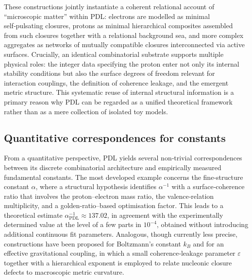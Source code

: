 \documentclass[11pt,a4paper]{article}
\begin{document}
These constructions jointly instantiate a coherent relational account of “microscopic matter” within PDL: electrons are modelled as minimal self‑pulsating closures, protons as minimal hierarchical composites assembled from such closures together with a relational background sea, and more complex aggregates as networks of mutually compatible closures interconnected via active surfaces.\cite{Laubscher2026FullPDL} Crucially, an identical combinatorial substrate supports multiple physical roles: the integer data specifying the proton enter not only its internal stability conditions but also the surface degrees of freedom relevant for interaction couplings, the definition of coherence leakage, and the emergent metric structure.\cite{Laubscher2026Alpha,Laubscher2026TopologicalReformulation} This systematic reuse of internal structural information is a primary reason why PDL can be regarded as a unified theoretical framework rather than as a mere collection of isolated toy models.

\subsection{Quantitative correspondences for constants}
From a quantitative perspective, PDL yields several non‑trivial correspondences between its discrete combinatorial architecture and empirically measured fundamental constants. The most developed example concerns the fine‑structure constant $\alpha$, where a structural hypothesis identifies $\alpha^{-1}$ with a surface‑coherence ratio that involves the proton–electron mass ratio, the valence‑relation multiplicity, and a golden‑ratio–based optimisation factor. This leads to a theoretical estimate $\alpha^{-1}_{\mathrm{PDL}} \approx 137.02$, in agreement with the experimentally determined value at the level of a few parts in $10^{-4}$, obtained without introducing additional continuous fit parameters.\cite{Laubscher2026Alpha,Laubscher2026GoldenRatioSurface} Analogous, though currently less precise, constructions have been proposed for Boltzmann’s constant $k_B$ and for an effective gravitational coupling, in which a small coherence‑leakage parameter $\varepsilon$ together with a hierarchical exponent is employed to relate nucleonic closure defects to macroscopic metric curvature.\cite{Laubscher2026FullPDL,Laubscher2026Exponent18}
\end{document}
